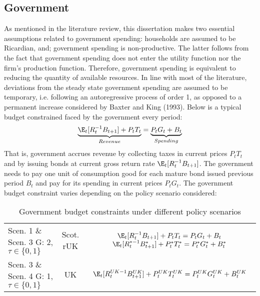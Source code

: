\subsection{Government}

As mentioned in the literature review, this dissertation makes two essential assumptions related to government spending: households are assumed to be Ricardian, and; government spending is non-productive. The latter follows from the fact that government spending does not enter the utility function nor the firm's production function. Therefore, government spending is equivalent to reducing the quantity of available resources. In line with most of the literature, deviations from the steady state government spending are assumed to be temporary, i.e. following an autoregressive process of order 1, as opposed to a permanent increase considered by Baxter and King (1993). Below is a typical budget constrained faced by the government every period:
\begin{align}
    \underbrace{\E_t [R^{-1}_tB_{t+1}] + P_t T_t}_{Revenue} = \underbrace{P_tG_t + B_t}_{Spending}
\end{align}
That is, government accrues revenue by collecting taxes in current prices $P_t T_t$ and by issuing bonds at current gross return rate $\E_t [R^{-1}_tB_{t+1}]$. The government needs to pay one unit of consumption good for each mature bond issued previous period $B_t$ and pay for its spending in current prices $P_t G_t$. The government budget constraint varies depending on the policy scenario considered:
\begin{table}[H]
    \renewcommand{\arraystretch}{2}
    \centering
    \begin{tabular}{l|c|c}
    \makecell{Scen. 1 \& Scen. 3\\ G: 2, $\tau \in \{0, 1\}$} & \makecell{Scot. \\ rUK } & 
        \makecell{
            $\E_t [R^{-1}_tB_{t+1}] + P_t T_t = P_tG_t + B_t$\\
            $\E_t [{R^{*-1}_{t}}B^*_{t+1}] + P^*_tT^*_t = P^*_tG^*_t + B^*_t$
        }  \\ 
    \makecell{Scen. 3 \& Scen. 4\\ G: 1, $\tau \in \{0, 1\}$} & UK & 
    $\E_t [{R^{UK-1}_{t}}B^{UK}_{t+1}] + P^{UK}_tT^{UK}_t = P^{UK}_tG^{UK}_t + B^{UK}_t$
    \end{tabular}
    \caption{Government budget constraints under different policy scenarios}
\end{table}
